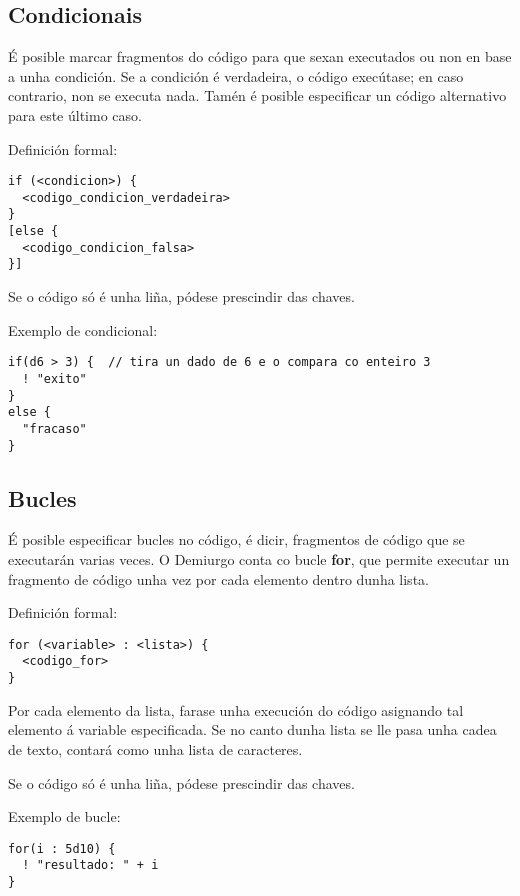 \subsection{Condicionais}
É posible marcar fragmentos do código para que sexan executados ou non en base a
unha condición. Se a condición é verdadeira, o código execútase; en caso
contrario, non se executa nada. Tamén é posible especificar un código
alternativo para este último caso.
\par Definición formal:
\begin{lstlisting}
if (<condicion>) {
  <codigo_condicion_verdadeira>
}
[else {
  <codigo_condicion_falsa>
}]
\end{lstlisting}
\par Se o código só é unha liña, pódese prescindir das chaves.
\par Exemplo de condicional:
\begin{lstlisting}
if(d6 > 3) {  // tira un dado de 6 e o compara co enteiro 3
  ! "exito"
}
else {
  "fracaso"
}
\end{lstlisting}

\subsection{Bucles}
É posible especificar bucles no código, é dicir, fragmentos de código que se
executarán varias veces. O Demiurgo conta co bucle {\bf for}, que permite
executar un fragmento de código unha vez por cada elemento dentro dunha lista.
\par Definición formal:
\begin{lstlisting}
for (<variable> : <lista>) {
  <codigo_for>
}
\end{lstlisting}
\par Por cada elemento da lista, farase unha execución do código asignando tal
elemento á variable especificada. Se no canto dunha lista se lle pasa unha cadea
de texto, contará como unha lista de caracteres.
\par Se o código só é unha liña, pódese prescindir das chaves.
\par Exemplo de bucle:
\begin{lstlisting}
for(i : 5d10) {
  ! "resultado: " + i
}
\end{lstlisting}

